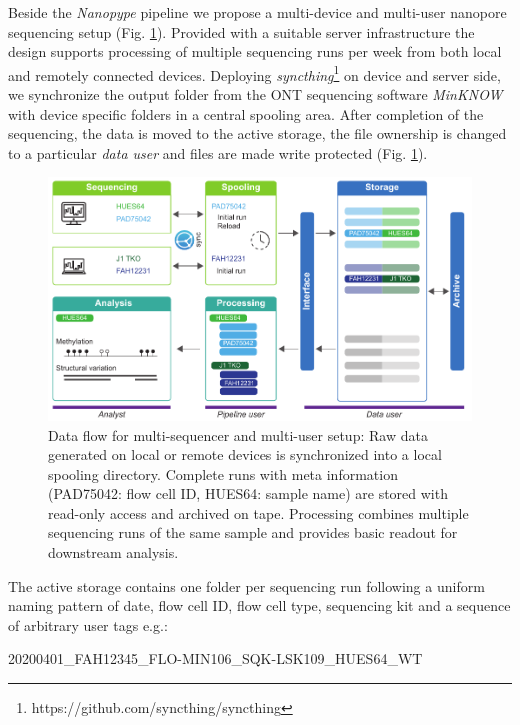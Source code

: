 Beside the \textit{Nanopype} pipeline we propose a multi-device and multi-user nanopore sequencing setup (Fig. \ref{fig:nanopype:storage}). Provided with a suitable server infrastructure the design supports processing of multiple sequencing runs per week from both local and remotely connected devices. Deploying \textit{syncthing}\footnote{https://github.com/syncthing/syncthing} on device and server side, we synchronize the output folder from the ONT sequencing software \textit{MinKNOW} with device specific folders in a central spooling area.
After completion of the sequencing, the data is moved to the active storage, the file ownership is changed to a particular \textit{data user} and files are made write protected (Fig. \ref{fig:nanopype:storage}).

\begin{figure}[h]
	\centering
	\includegraphics[width=1.0\textwidth]{figures/nanopype/storage.pdf}
	\captionsetup{format=plain}
	\caption[Nanopype data flow]{Data flow for multi-sequencer and multi-user setup: Raw data generated on local or remote devices is synchronized into a local spooling directory. Complete runs with meta information (PAD75042: flow cell ID, HUES64: sample name) are stored with read-only access and archived on tape. Processing combines multiple sequencing runs of the same sample and provides basic readout for downstream analysis.}
	\label{fig:nanopype:storage}
\end{figure}

The active storage contains one folder per sequencing run following a uniform naming pattern of date, flow cell ID, flow cell type, sequencing kit and a sequence of arbitrary user tags e.g.:

\begin{center}
	20200401\_FAH12345\_FLO-MIN106\_SQK-LSK109\_HUES64\_WT
\end{center}


